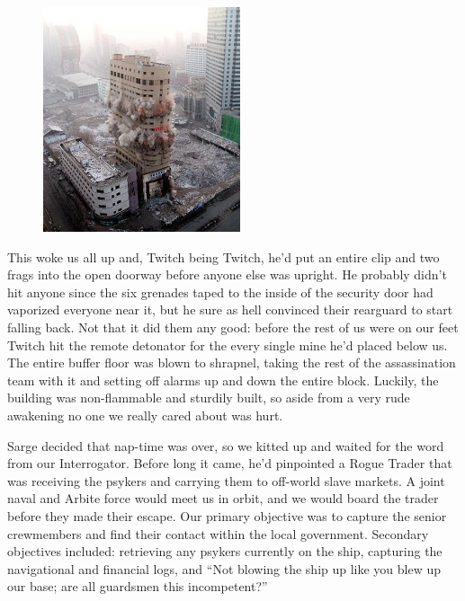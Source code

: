 \begin{figure}
\begin{center}
	\includegraphics[width=\figwidth]{pics/3/18.png}
\end{center}
\end{figure}
This woke us all up and, Twitch being Twitch, he’d put an entire clip and two frags into the open doorway before anyone else was upright. 
He probably didn’t hit anyone since the six grenades taped to the inside of the security door had vaporized everyone near it, but he sure as hell convinced their rearguard to start falling back. 
Not that it did them any good: before the rest of us were on our feet Twitch hit the remote detonator for the every single mine he’d placed below us. 
The entire buffer floor was blown to shrapnel, taking the rest of the assassination team with it and setting off alarms up and down the entire block. 
Luckily, the building was non-flammable and sturdily built, so aside from a very rude awakening no one we really cared about was hurt.

Sarge decided that nap-time was over, so we kitted up and waited for the word from our Interrogator. 
Before long it came, he’d pinpointed a Rogue Trader that was receiving the psykers and carrying them to off-world slave markets. 
A joint naval and Arbite force would meet us in orbit, and we would board the trader before they made their escape. 
Our primary objective was to capture the senior crewmembers and find their contact within the local government. 
Secondary objectives included: retrieving any psykers currently on the ship, capturing the navigational and financial logs, and “Not blowing the ship up like you blew up our base; are all guardsmen this incompetent?”

